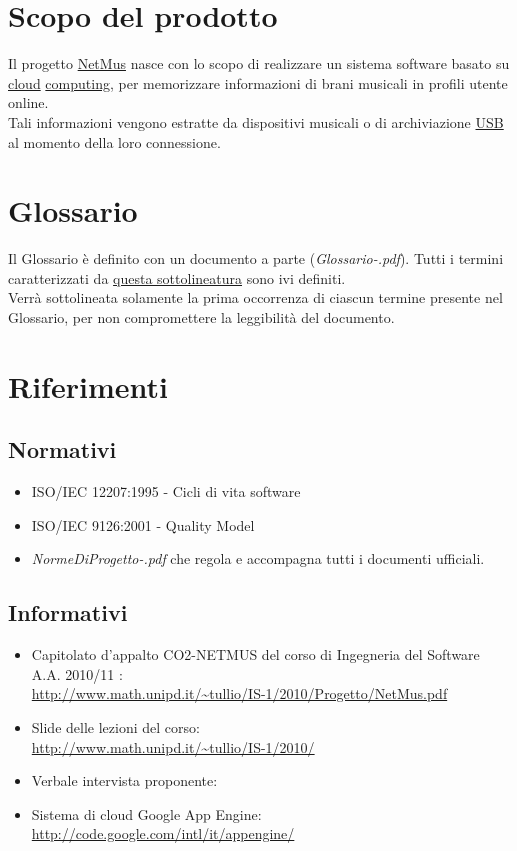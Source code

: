 
\section{Scopo del prodotto}
Il progetto \underline{NetMus} nasce con lo scopo di realizzare un sistema
software basato su \underline{cloud} \underline{computing}, per memorizzare
informazioni di brani musicali in profili utente online.\\ Tali informazioni vengono estratte da
dispositivi musicali o di archiviazione \underline{USB} al momento della loro connessione.

\section{Glossario}
Il Glossario \`e definito con un documento a parte
(\emph{Glossario-\versioneglossario.pdf}). Tutti i termini caratterizzati da
\underline{questa sottolineatura} sono ivi definiti.\\
Verr\`a sottolineata solamente la prima occorrenza di ciascun
termine presente nel Glossario, per non compromettere la leggibilit\`a del documento.

\section{Riferimenti}

\subsection{Normativi} %
\begin{itemize}
  \item ISO/IEC 12207:1995 - Cicli di vita software
  \item ISO/IEC 9126:2001 - Quality Model
  \item \emph{NormeDiProgetto-\versionenormeprogetto.pdf} che regola e
  accompagna tutti i documenti ufficiali.
\end{itemize}
\newpage
\subsection{Informativi}
\begin{itemize}
  \item Capitolato d'appalto CO2-NETMUS del corso di Ingegneria del Software
  A.A. 2010/11 :\\
  \url{http://www.math.unipd.it/~tullio/IS-1/2010/Progetto/NetMus.pdf}
  \item Slide delle lezioni del corso:\\
  \url{http://www.math.unipd.it/~tullio/IS-1/2010/}
  \item Verbale intervista proponente:\\
  \item Sistema di cloud Google App Engine:\\
  \url{http://code.google.com/intl/it/appengine/}
\end{itemize}
